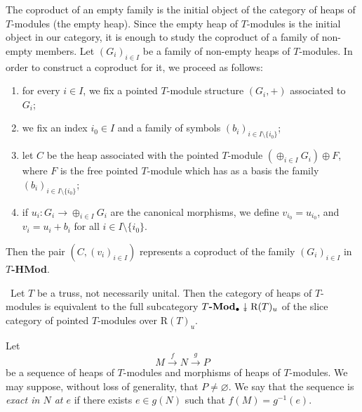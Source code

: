 \documentclass[11pt, twoside]{article}
\newcommand{\twoheaddownarrow}{\mathrel{\rotatebox[origin=c]{-90}{$\twoheadrightarrow$}}}
\begin{document}
\begin{construction}{\rm \cite[Construction 4.10]{mb}}
The coproduct of an empty family is the initial object of the category of heaps of $T$-modules (the empty heap). Since the empty heap of $T$-modules is the initial object in our category, it is enough to study the coproduct of a family of non-empty members.
Let $(G_{i})_{i\in I}$ be a family of non-empty heaps of $T$-modules. In order to construct a coproduct for it, we proceed as follows:
\begin{enumerate}
    \item[(a)] for every $i\in I$, we fix a pointed $T$-module structure $(G_{i},+)$ associated to $G_{i}$;
    \item[(b)] we fix an index $i_{0}\in I$ and a family of symbols $(b_{i})_{i\in I\setminus\{i_{0}\}}$;
    \item[(c)] let $C$ be the heap associated with the pointed $T$-module $(\oplus_{i\in I}G_{i})\oplus F$, where $F$ is the free pointed $T$-module which has as a basis the family $(b_{i})_{i\in I\setminus\{i_{0}\}}$;
    \item[(d)] if $u_{i}:G_{i}\to\oplus_{i\in I}G_{i}$ are the canonical morphisms, we define $v_{i_{0}}=u_{i_{0}}$, and $v_{i}=u_{i}+b_{i}$ for all $i\in I\setminus\{i_{0}\}$.
\end{enumerate}
Then the pair $(C,(v_{i})_{i\in I})$ represents a coproduct of the family $(G_{i})_{i\in I}$ in $T$\textbf{-HMod}.
\end{construction}

\begin{corollary}{\rm \cite[Corollary 4.15]{mb}}\rm
~Let $T$ be a truss, not necessarily unital. Then the category of heaps of $T$-modules is equivalent to the full subcategory $T \textbf{-Mod}_{\bullet}\twoheaddownarrow \mathrm{R}(T)_{u}$ of the slice category of pointed $T$-modules over $\mathrm{R}(T)_{u}$.
\end{corollary}


\begin{definition}{\rm \cite[Definition 5.1]{mb}}
Let
\begin{equation}
M \xrightarrow{f} N\xrightarrow{g} P
\end{equation}
be a sequence of heaps of $T$-modules and morphisms of heaps of $T$-modules. We may suppose, without loss of generality, that $P \neq \varnothing$.
We say that the sequence is \textit{exact in $N$ at $e$} if there exists $e\in g(N)$ such that $f(M)=g^{-1}(e)$.
\end{definition}
\end{document}
